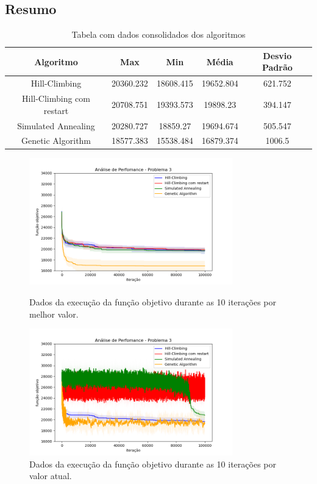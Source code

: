\subsection{Resumo}

\begin{table}[h!]
\centering
\begin{tabular}{ |c|c|c|c|c|  }
\hline
\rowcolor{lightgray}
Algoritmo & Max & Min & Média & Desvio Padrão \\
\hline
Hill-Climbing & 20360.232 & 18608.415 & 19652.804 & 621.752 \\
\hline
Hill-Climbing com restart & 20708.751 & 19393.573 & 19898.23 & 394.147 \\
\hline
Simulated Annealing & 20280.727 & 18859.27 & 19694.674 & 505.547 \\
\hline
Genetic Algorithm & 18577.383 & 15538.484 & 16879.374 & 1006.5 \\
\hline

\end{tabular}
\caption{Tabela com dados consolidados dos algoritmos}
\end{table}

\begin{figure}[H]
\centering
  \begin{minipage}[b]{0.48\textwidth}
    \includegraphics[width=88mm]{imagens/otima/problema-3-performance-algoritmos-best.png}
    \caption{Dados da execução da função objetivo durante as 10 iterações por melhor valor.
    \label{fig:problema-3-performance-algoritmos-best}}
  \end{minipage}
  \hfill
  \begin{minipage}[b]{0.48\textwidth}
    \includegraphics[width=88mm]{imagens/otima/problema-3-performance-algoritmos-value.png}
    \caption{Dados da execução da função objetivo durante as 10 iterações por valor atual.
    \label{fig:problema-3-performance-algoritmos-value}}
  \end{minipage}
\end{figure}